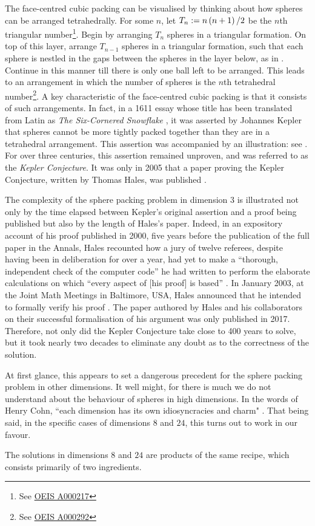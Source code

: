 The face-centred cubic packing can be visualised by thinking about how spheres can be arranged tetrahedrally. For some $n$, let $T_n := n\left( n + 1 \right)/2$ be the $n$th triangular number\footnote{See \href{https://oeis.org/A000217}{OEIS A000217}}. Begin by arranging $T_n$ spheres in a triangular formation. On top of this layer, arrange $T_{n - 1}$ spheres in a triangular formation, such that each sphere is nestled in the gaps between the spheres in the layer below, as in . Continue in this manner till there is only one ball left to be arranged. This leads to an arrangement in which the number of spheres is the $n$th tetrahedral number\footnote{See \href{https://oeis.org/A000292}{OEIS A000292}}. A key characteristic of the face-centred cubic packing is that it consists of such arrangements. In fact, in a 1611 essay whose title has been translated from Latin as \textit{The Six-Cornered Snowflake} \cite{KeplerSnowflake}, it was asserted by Johannes Kepler that spheres cannot be more tightly packed together than they are in a tetrahedral arrangement. This assertion was accompanied by an illustration: see . For over three centuries, this assertion remained unproven, and was referred to as the \textit{Kepler Conjecture}. It was only in 2005 that a paper proving the Kepler Conjecture, written by Thomas Hales, was published \cite{HalesKeplerInformal}.

The complexity of the sphere packing problem in dimension $3$ is illustrated not only by the time elapsed between Kepler's original assertion and a proof being published but also by the length of Hales's paper. Indeed, in an expository account of his proof published in 2000, five years before the publication of the full paper in the Annals, Hales recounted how a jury of twelve referees, despite having been in deliberation for over a year, had yet to make a ``thorough, independent check of the computer code'' he had written to perform the elaborate calculations on which ``every aspect of [his proof] is based'' \cite{CannonHoney}. In January 2003, at the Joint Math Meetings in Baltimore, USA, Hales announced that he intended to formally verify his proof \cite{HalesKeplerFormal}. The paper authored by Hales and his collaborators on their successful formalisation of his argument was only published in 2017. Therefore, not only did the Kepler Conjecture take close to 400 years to solve, but it took nearly two decades to eliminate any doubt as to the correctness of the solution.

At first glance, this appears to set a dangerous precedent for the sphere packing problem in other dimensions. It well might, for there is much we do not understand about the behaviour of spheres in high dimensions. In the words of Henry Cohn, ``each dimension has its own idiosyncracies and charm" \cite{CohnOnViazovskaAMS}. That being said, in the specific cases of dimensions $8$ and $24$, this turns out to work in our favour.

The solutions in dimensions $8$ and $24$ are products of the same recipe, which consists primarily of two ingredients.